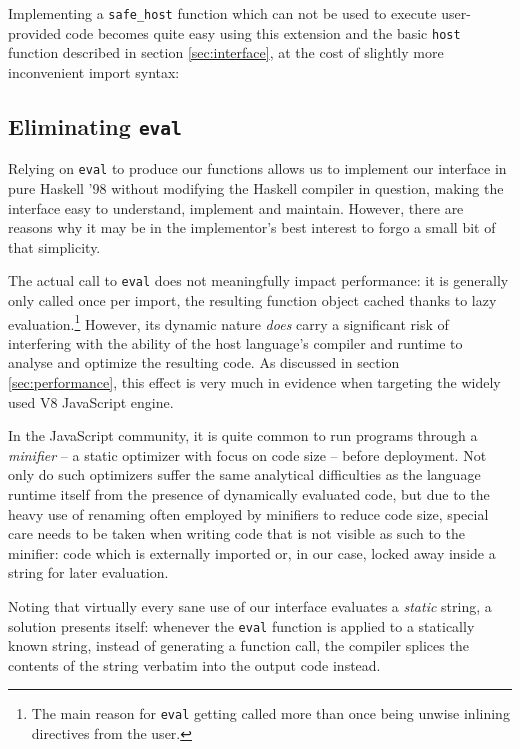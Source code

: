 \documentclass[preprint]{sigplanconf}
\begin{document}
Implementing a \lstinline!safe_host! function which can not be used
to execute user-provided code becomes quite easy using
this extension and the basic \lstinline!host! function described in section
\ref{sec:interface}, at the cost of slightly more inconvenient import syntax:


\subsection{Eliminating \lstinline!eval!}
\label{sec:inline-eval}
Relying on \lstinline!eval! to produce our functions allows us to
implement our interface in pure Haskell '98 without modifying the Haskell
compiler in question, making the interface easy to understand, implement and
maintain. However, there are reasons why it may be in the implementor's best
interest to forgo a small bit of that simplicity.

The actual call to \lstinline!eval! does not meaningfully impact
performance: it is generally only called once per import,
the resulting function object cached thanks to lazy evaluation.\footnote{
  The main reason for \lstinline!eval! getting called more than once
  being unwise inlining directives from the user.
}
However, its dynamic nature \emph{does}
carry a significant risk of interfering with the ability of the host language's
compiler and runtime to analyse and optimize the resulting code.
As discussed in section \ref{sec:performance}, this effect is very much in
evidence when targeting the widely used V8 JavaScript engine.

In the JavaScript community, it is quite common to run programs through a
\emph{minifier} -- a static optimizer with focus on code size -- before
deployment. Not only do such optimizers suffer the same analytical
difficulties as the language runtime itself from the presence of dynamically
evaluated code, but due to the heavy use of
renaming often employed by minifiers to reduce code size, special care needs
to be taken when writing code that is not visible as such to the minifier:
code which is externally imported or, in our case, locked away inside a string
for later evaluation.

Noting that virtually every sane use of our interface evaluates a \emph{static}
string, a solution presents itself: whenever the \lstinline!eval! function
is applied to a statically known string, instead of generating a function call,
the compiler splices the contents of the string verbatim into the output code
instead.
\end{document}
